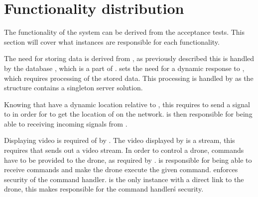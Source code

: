 \section{Functionality distribution}\label{sec:functionality_distrubution}

The functionality of the system can be derived from the acceptance tests.
This section will cover what instances are responsible for each functionality.

The need for storing data is derived from , as previously described this is handled by the database , which is a part of .
 sets the need for a dynamic response to , which requires processing of the stored data.
This processing is handled by  as the structure contains a singleton server solution.

Knowing that  have a dynamic location relative to , this requires  to send a signal to  in order for  to get the location of  on the network.
 is then responsible for being able to receiving incoming signals from .

Displaying video is required of  by .
The video displayed by  is a stream, this requires that  sends out a video stream.
In order to control a drone, commands have to be provided to the drone, as required by .
 is responsible for being able to receive commands and make the drone execute the given command.
 enforces security of the command handler.
 is the only instance with a direct link to the drone, this makes  responsible for the command handler\'s security.





